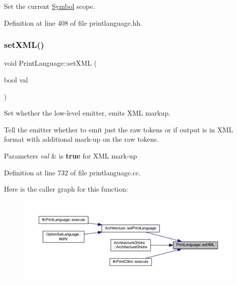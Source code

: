 Set the current \mbox{\hyperlink{class_symbol}{Symbol}} scope. 



Definition at line 408 of file printlanguage.\+hh.

\mbox{\label{class_print_language_abec94ce8a6a2afb7daa0cc6bd6b222d8}} 
\subsubsection{\texorpdfstring{setXML()}{setXML()}}
{\footnotesize\ttfamily void Print\+Language\+::set\+X\+ML (\begin{DoxyParamCaption}\item[{bool}]{val }\end{DoxyParamCaption})}



Set whether the low-\/level emitter, emits X\+ML markup. 

Tell the emitter whether to emit just the raw tokens or if output is in X\+ML format with additional mark-\/up on the raw tokens. 
\begin{DoxyParams}{Parameters}
{\em val} & is {\bfseries{true}} for X\+ML mark-\/up \\
\hline
\end{DoxyParams}


Definition at line 732 of file printlanguage.\+cc.

Here is the caller graph for this function\+:
\nopagebreak
\begin{figure}[H]
\begin{center}
\leavevmode
\includegraphics[width=350pt]{class_print_language_abec94ce8a6a2afb7daa0cc6bd6b222d8_icgraph}
\end{center}
\end{figure}
\mbox{\label{class_print_language_a4438c48a32bb84170fe5736e4f13267b}} 
